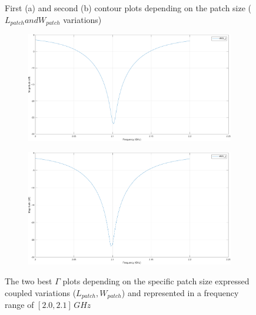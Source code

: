 \documentclass[12pt,a4paper]{article}
\begin{document}
{\begin{figure}[h]
\begin{center}
\begin{subfigure}{0.5\linewidth}
			\caption{}
			\label{fig:second contour}
		\end{subfigure}
	\caption{\selectfont
		\color{gray}First (a) and second (b) contour plots depending on the patch size ($L_{patch} and W_{patch}$ variations)}
	\end{center}  
\end{figure}
\begin{figure}
	\begin{center}
		\begin{subfigure}{0.5\linewidth}
			\includegraphics[scale=0.25]{gamma1.pdf}
		\end{subfigure}
		\begin{subfigure}{0.5\linewidth}
		\includegraphics[scale=0.25]{gamma3.pdf}
	\end{subfigure}
	\caption{\selectfont
	\color{gray}The two best $\Gamma$ plots depending on the specific patch size expressed coupled variations ($L_{patch},W_{patch}$) and represented in a frequency range of $[2.0,2.1]\,GHz$}
\label{fig:Gamma couple LpWp}
	\end{center}  
\end{figure}
\begin{figure}[h]

\end{figure}}
\end{document}

